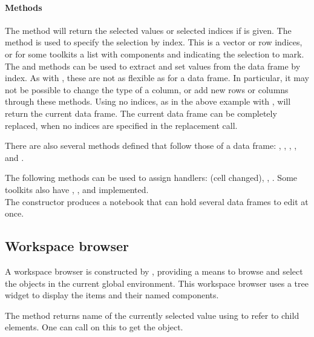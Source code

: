 \paragraph{Methods} The  method will return the
selected values or selected indices if  is given. The
 method is used to specify the selection by
index. This is a vector or row indices, or for some toolkits a list
with components  and  indicating the
selection to mark.  The \method{[}{gdf} and \method{[\ASSIGN}{gdf}
methods can be used to extract and set values from the data frame by
index. As with , these are not as flexible as for a data
frame. In particular, it may not be possible to change the type of a
column, or add new rows or columns through these methods. Using no
indices, as in the above example with , will return the
current data frame. The current data frame can be completely replaced,
when no indices are specified in the replacement call.

There are also several methods defined that follow those of a data
frame: , ,
, , and
.

The following methods can be used to assign handlers:
 (cell changed),
,
. Some toolkits also have
,
, and
 implemented.
\\


The  constructor produces a notebook that can
hold several data frames to edit at once.





\subsection{Workspace browser}
\label{sec:gWidgets-workspace-browser}

A workspace browser is constructed by , providing a
means to browse and select the objects in the current global
environment. This workspace browser uses a tree widget to display the
items and their named components.

The  method returns name of the currently selected value
using \code{\$} to refer to child elements.  One can call
 on this to get the object.


